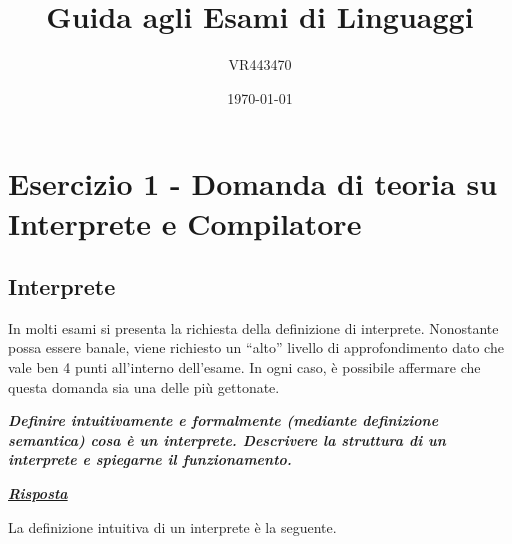\documentclass[a4paper]{article}
\newcommand{\dquotes}[1]{``#1''}
\begin{document}
	\author{VR443470}
	\title{Guida agli Esami di Linguaggi}
	\date{\printdayoff\today}
	\maketitle
	
	\newpage
	
	\tableofcontents
	
	\newpage
	
	\section{Esercizio 1 - Domanda di teoria su Interprete e Compilatore}
	
	\subsection{Interprete}
	
	In molti esami si presenta la richiesta della definizione di interprete. Nonostante possa essere banale, viene richiesto un \dquotes{alto} livello di approfondimento dato che vale ben 4 punti all'interno dell'esame. In ogni caso, è possibile affermare che questa domanda sia una delle più gettonate.\newline
	
	\noindent
	\textcolor{Red3}{\textbf{\emph{Definire intuitivamente e formalmente (mediante definizione semantica) cosa è un interprete. Descrivere la struttura di un interprete e spiegarne il funzionamento.}}}\newline
	
	\noindent
	\textcolor{Green4}{\textbf{\emph{\underline{Risposta}}}}\newline
	
	\noindent
	La definizione intuitiva di un interprete è la seguente.
	
\end{document}
